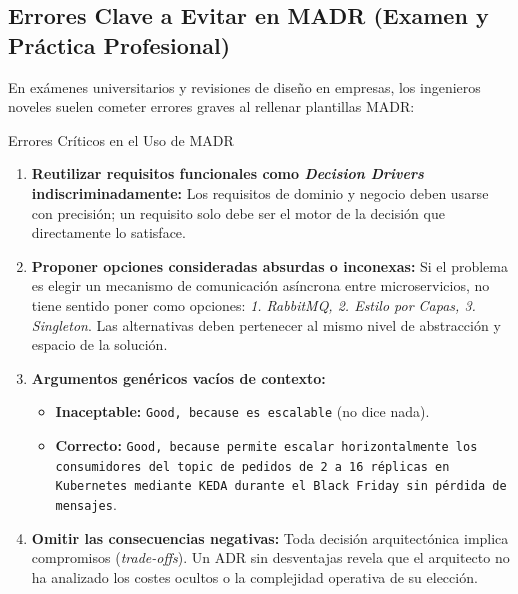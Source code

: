 \subsection{Errores Clave a Evitar en MADR (Examen y Práctica Profesional)}

En exámenes universitarios y revisiones de diseño en empresas, los ingenieros noveles suelen cometer errores graves al rellenar plantillas MADR:

\begin{antipatron}{Errores Críticos en el Uso de MADR}
\begin{enumerate}[leftmargin=1.5em]
  \item \textbf{Reutilizar requisitos funcionales como \emph{Decision Drivers} indiscriminadamente:} Los requisitos de dominio y negocio deben usarse con precisión; un requisito solo debe ser el motor de la decisión que directamente lo satisface.
  \item \textbf{Proponer opciones consideradas absurdas o inconexas:} Si el problema es elegir un mecanismo de comunicación asíncrona entre microservicios, no tiene sentido poner como opciones: \emph{1. RabbitMQ, 2. Estilo por Capas, 3. Singleton}. Las alternativas deben pertenecer al mismo nivel de abstracción y espacio de la solución.
  \item \textbf{Argumentos genéricos vacíos de contexto:}
    \begin{itemize}
      \item \textcolor{alertred}{\textbf{Inaceptable:}} \texttt{Good, because es escalable} (no dice nada).
      \item \textcolor{alertgreen}{\textbf{Correcto:}} \texttt{Good, because permite escalar horizontalmente los consumidores del topic de pedidos de 2 a 16 réplicas en Kubernetes mediante KEDA durante el Black Friday sin pérdida de mensajes}.
    \end{itemize}
  \item \textbf{Omitir las consecuencias negativas:} Toda decisión arquitectónica implica compromisos (\emph{trade-offs}). Un ADR sin desventajas revela que el arquitecto no ha analizado los costes ocultos o la complejidad operativa de su elección.
\end{enumerate}
\end{antipatron}

